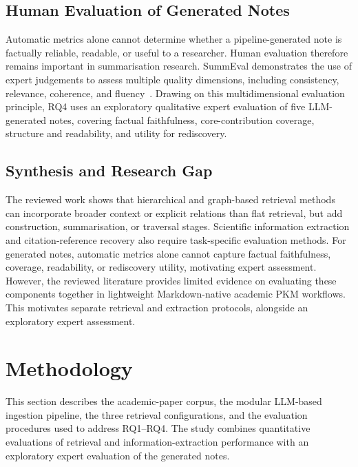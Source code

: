 \documentclass[runningheads]{llncs}
\begin{document}
\subsection{Human Evaluation of Generated Notes}

Automatic metrics alone cannot determine whether a pipeline-generated
note is factually reliable, readable, or useful to a researcher. Human
evaluation therefore remains important in summarisation research.
SummEval demonstrates the use of expert judgements to assess multiple
quality dimensions, including consistency, relevance, coherence, and
fluency~\cite{fabbri2021summeval}. Drawing on this multidimensional
evaluation principle, RQ4 uses an exploratory qualitative expert
evaluation of five LLM-generated notes, covering factual faithfulness,
core-contribution coverage, structure and readability, and utility for
rediscovery.

\subsection{Synthesis and Research Gap}

The reviewed work shows that hierarchical and graph-based retrieval
methods can incorporate broader context or explicit relations than flat
retrieval, but add construction, summarisation, or traversal stages.
Scientific information extraction and citation-reference recovery also
require task-specific evaluation methods. For generated notes, automatic
metrics alone cannot capture factual faithfulness, coverage, readability,
or rediscovery utility, motivating expert assessment. However, the
reviewed literature provides limited evidence on evaluating these
components together in lightweight Markdown-native academic PKM
workflows. This motivates separate retrieval and extraction protocols,
alongside an exploratory expert assessment.

\section{Methodology}
\label{sec:methodology}

This section describes the academic-paper corpus, the modular
LLM-based ingestion pipeline, the three retrieval configurations, and
the evaluation procedures used to address RQ1--RQ4. The study combines
quantitative evaluations of retrieval and information-extraction
performance with an exploratory expert evaluation of the generated
notes.
\end{document}
